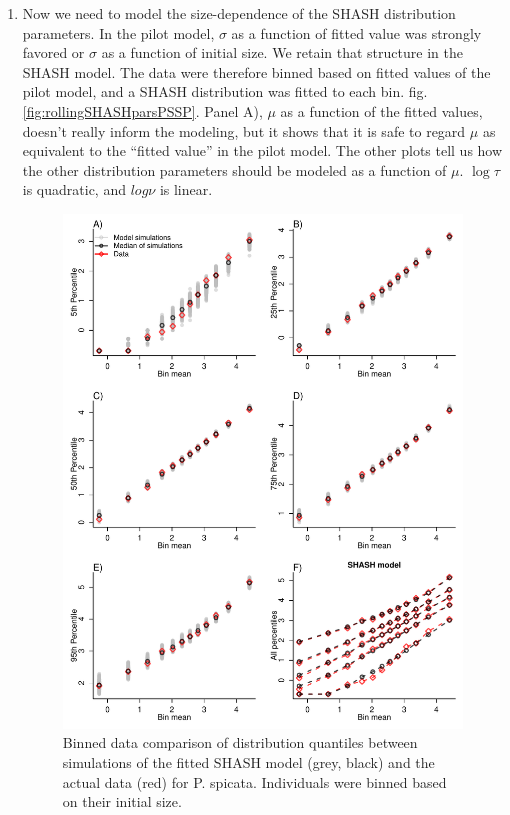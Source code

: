 \documentclass[12pt]{article}
\begin{document}
\begin{enumerate}
\item Now we need to model the size-dependence of the SHASH distribution parameters. In the pilot model, $\sigma$ as a function
of fitted value was strongly favored or $\sigma$ as a function of initial size. We retain that structure in the SHASH model. 
The data were therefore binned based on fitted values of the pilot model, and a SHASH distribution was fitted to each bin. 
fig. \ref{fig:rollingSHASHparsPSSP}. Panel A), $\mu$ as a function of the fitted values, doesn't really inform the 
modeling, but it shows that it is safe to regard $\mu$ as equivalent to the ``fitted value'' in the pilot model. 
The other plots tell us how the other distribution parameters should be modeled as a function of $\mu$. $\log \tau$ is quadratic,
and $log \nu$ is linear. 
 

\begin{figure}[tbp]
\centering
\includegraphics[width=.9\textwidth]{figures/QuantileComparePlotPSSP.pdf}
\caption{Binned data comparison of distribution quantiles between simulations of the fitted SHASH model (grey, black) and the actual data (red) for 
{P. spicata}. Individuals were binned based on their initial size. }
\label{fig:BinnedConditionalQuantiles}
\end{figure} 



\end{enumerate}
\end{document}
